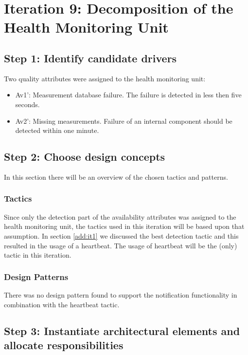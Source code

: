 \section{Iteration 9: Decomposition of the Health Monitoring Unit}
\label{add:it9}

\subsection{Step 1: Identify candidate drivers}
\label{add:it9/drivers}

\npar Two quality attributes were assigned to the health monitoring unit:

\begin{itemize}
  	\item Av1': Measurement database failure. The failure is detected in less then five seconds.
  	\item Av2': Missing measurements. Failure of an internal component should be
  	detected within one minute.
\end{itemize}

\subsection{Step 2: Choose design concepts}
\label{add:it9/concepts}

\npar In this section there will be an overview of the chosen tactics and
patterns.

\subsubsection{Tactics}
\label{add:it9/tactics}

\npar Since only the detection part of the availability attributes was assigned
to the health monitoring unit, the tactics used in this iteration will be based
upon that assumption. In section \ref{add:it1} we discussed the best detection
tactic and this resulted in the usage of a heartbeat. The usage of heartbeat
will be the (only) tactic in this iteration.

\subsubsection{Design Patterns}
\label{add:it9/patterns}

\npar There was no design pattern found to support the notification
functionality in combination with the heartbeat tactic.

\subsection{Step 3: Instantiate architectural elements and allocate responsibilities}
\label{add:it9/elements}

